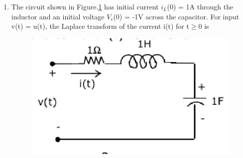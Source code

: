 \documentclass[journal,12pt,twocolumn]{IEEEtran}
\begin{document}
\begin{enumerate}
\item The circuit shown in Figure.\ref{fig55} has initial current $i_{L}$(0) = 1A through the inductor
and an initial voltage $V_{c}$(0) = -1V across the capacitor. For input v(t) = u(t), the
Laplace transform of the current i(t) for t$\geq$0 is
\begin{enumerate}
\setlength\itemsep{2em}
\begin{figure}[!h]
\begin{center}
\includegraphics[scale=0.7]{./figs/fig55.eps}
\caption{}
\label{fig55}
\end{center}
\end{figure}
\end{enumerate}


\end{enumerate}
\end{document}
